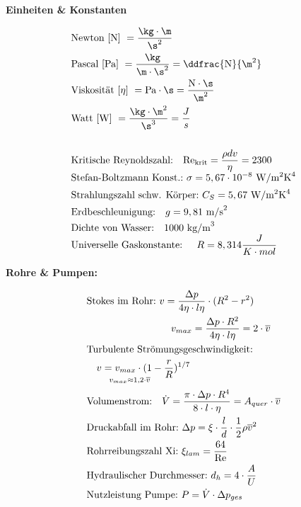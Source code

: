 \begin{minipage}[t]{.35\textwidth}

\textbf{Einheiten \& Konstanten}\par \vspace*{-4mm}

\begin{align*}
&\text{Newton [N]} ~	= \frac{\kg \cdot \m}{\s^2} \\
&\text{Pascal [Pa]} ~	= \frac{\kg}{\m \cdot \s^2} = \ddfrac{\text{N}}{\m^2} \\ 
&\text{Viskosität [$\eta$]} ~	= \text{Pa}\cdot \s = \frac{\text{N} \cdot \s}{\m^2} \\ 
&\text{Watt [W]} ~ = \frac{\kg \cdot \m^2}{\s^3} = \frac{J}{s}\\ \\
&\text{Kritische Reynoldszahl:} \quad \text{Re}_{\text{krit}} = \frac{\rho d v}{\eta} = 2300 \\[-4pt] 
&\text{Stefan-Boltzmann Konst.:} ~\sigma = 5,67 \cdot 10^{-8}~ \text{W}/ \text{m}^{2}\text{K}^{4}\\[1pt]
&\text{Strahlungszahl schw. Körper:} ~C_S = 5,67~ \text{W}/ \text{m}^{2}\text{K}^{4}\\
&\text{Erdbeschleunigung:} \quad g = 9,81 ~\text{m/s}^2 \\[-1pt]
&\text{Dichte von Wasser:} \quad 1000 ~\text{kg/m}^3 \\[-4pt]
&\text{Universelle Gaskonstante: } \quad R = 8,314 \frac{J}{K \cdot mol}
\end{align*}


\vspace*{2mm}
\textbf{Rohre \& Pumpen:}\par \vspace*{-4mm}
\begin{align*}
&\text{Stokes im Rohr:} ~ v = \frac{\Delta p}{4\eta \cdot l \eta} \cdot (R^2-r^2) \\ 
& \hspace*{3cm} v_{max} = \frac{\Delta p \cdot R^2}{4\eta \cdot l \eta} = 2 \cdot \overline{v} \\
&\text{Turbulente Strömungsgeschwindigkeit:}\\ & \quad v = v_{max} \cdot (1-\frac{r}{R})^{1/7}\\[-8pt]
&\hspace*{0.8cm} \scriptstyle{v_{max} \approx 1,2 \cdot \overline{v}}\\
&\text{Volumenstrom:} \quad \dot{V} = \frac{\pi \cdot \Delta p \cdot R^4}{8 \cdot l \cdot \eta} = A_{quer} \cdot \overline{v} \\ 
& \text{Druckabfall im Rohr:} ~ \Delta p = \xi \cdot \frac{l}{d} \cdot \frac{1}{2}\rho\overline{v}^2\\
&\text{Rohrreibungszahl Xi:} ~ \xi_{lam} = \frac{64}{\text{Re}}\\
&\text{Hydraulischer Durchmesser:} ~ d_h = 4\cdot \frac{A}{U}\\
&\text{Nutzleistung Pumpe:} ~ P = \dot{V} \cdot \Delta p_{ges}  \\
\end{align*}





\end{minipage}
